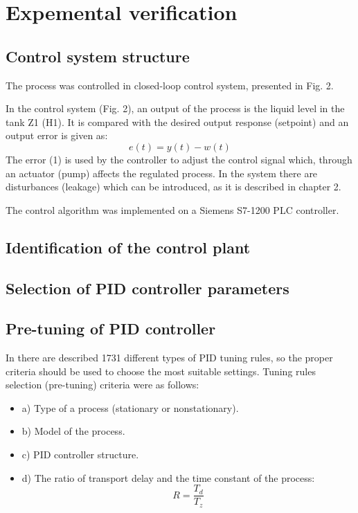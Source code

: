 \documentclass{amcs}
\begin{document}
\section{Expemental verification}

\subsection{Control system structure}
%
The process was controlled in closed-loop control system, presented in Fig. 2.

In the control system (Fig. 2), an output of the process   is the liquid level in the tank Z1 (H1). It is compared with the desired output response (setpoint)   and an output error is given as:
\begin{equation}
e(t)=y(t)-w(t)
\end{equation}
The error (1) is used by the controller to adjust the control signal   which, through an actuator (pump) affects the regulated process. In the system there are disturbances   (leakage) which can be introduced, as it is described in chapter 2.

The control algorithm was implemented on a Siemens S7-1200 PLC controller. 

\subsection{Identification of the control plant}

\subsection{Selection of PID controller parameters}
%
\subsection{Pre-tuning of PID controller}
In \cite{Odwyer:2009} there are described 1731 different types of PID tuning rules, so the proper criteria should be used to choose the most suitable settings. Tuning rules selection (pre-tuning) criteria were as follows:
%
\begin{itemize}
\item a) Type of a process (stationary or nonstationary).
\item b) Model of the process.
\item c) PID controller structure.
\item d) The ratio of transport delay and the time constant of the process:
\begin{equation}
R=\dfrac{T_{d}}{T_{z}}
\end{equation}
\end{itemize}
\end{document}

